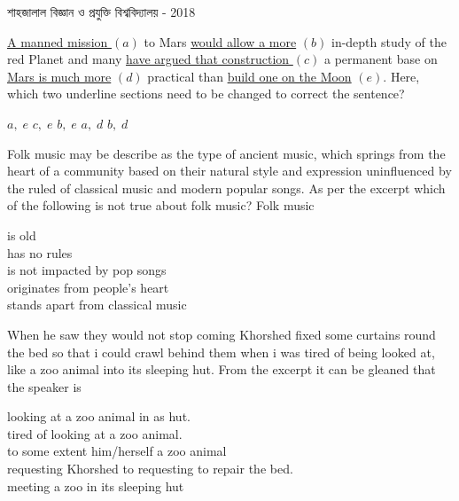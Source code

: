 \documentclass[addpoints]{exam}
\begin{document}
\begin{LARGE}
\begin{center}
শাহজালাল বিজ্ঞান ও প্রযুক্তি বিশ্ববিদ্যালয় - 2018
\end{center}
\end{LARGE}
\begin{questions}

\question  \underline{ A manned mission } $(a)$ to Mars \underline{would allow a more} $ (b) $ in-depth study of the red Planet and many \underline{have argued that construction } $ (c) $ a permanent base on \underline{Mars is much more} $ (d) $ practical than \underline{ build one on the Moon} $ (e) $. Here, which two underline sections need to be changed to correct the sentence? 

\begin{oneparchoices}
\choice $ a,\;e $
\choice $ c,\;e $
\choice $ b,\;e $
\choice $ a,\;d $
\choice $ b,\;d $
\end{oneparchoices}

 \question  Folk music may be describe as the type of ancient music, which springs from the heart of a community based on their natural style and expression uninfluenced by the ruled of classical music and modern popular songs. As per the excerpt which of the following is not true about folk music? Folk music 

\begin{oneparchoices}
\hspace*{.2cm} \choice is old\\
\choice has no rules\\
\choice is not impacted by pop songs\\
\choice originates from people's heart\\
\choice stands apart from classical music
\end{oneparchoices}

\question  When he saw they would not stop coming Khorshed fixed some curtains round the bed so that i could crawl behind them when i was tired of being looked at, like a zoo animal into its sleeping hut. From the excerpt it can be gleaned that the speaker is  

\begin{oneparchoices}
\hspace*{.2cm} \choice looking at a zoo animal in as hut.\\
\choice tired of looking at a zoo animal.\\ 
\choice to some extent him/herself a zoo animal \\
\choice requesting Khorshed to requesting to repair the bed.\\
\choice meeting a zoo in its sleeping hut
\end{oneparchoices}


\end{questions}
\end{document}
